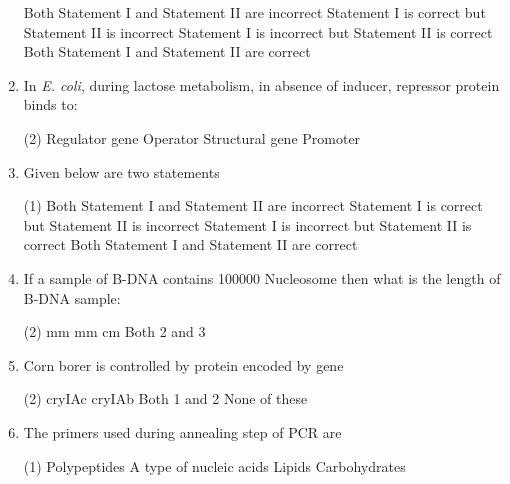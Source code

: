 \documentclass[twocolumn]{article}
\begin{document}
\begin{enumerate}
\begin{tasks}
              \task Both Statement I and Statement II are incorrect
              \task Statement I is correct but Statement II is incorrect
              \task Statement I is incorrect but Statement II is correct
              \task Both Statement I and Statement II are correct
          \end{tasks}
    \item In \textit{E. coli}, during lactose metabolism, in absence of inducer, repressor protein binds to:
          \begin{tasks}(2)
              \task Regulator gene
              \task Operator
              \task Structural gene
              \task Promoter
          \end{tasks}
    \item Given below are two statements
          \begin{tasks}(1)
              \task Both Statement I and Statement II are incorrect
              \task Statement I is correct but Statement II is incorrect
              \task Statement I is incorrect but Statement II is correct
              \task Both Statement I and Statement II are correct
          \end{tasks}
    \item If a sample of B-DNA contains 100000 Nucleosome then what is the length of B-DNA sample:
          \begin{tasks}(2)
               mm
               mm
               cm
              \task Both 2 and 3
          \end{tasks}
    \item Corn borer is controlled by protein encoded by gene
          \begin{tasks}(2)
              \task cryIAc
              \task cryIAb
              \task Both 1 and 2
              \task None of these
          \end{tasks}
    \item The primers used during annealing step of PCR are
          \begin{tasks}(1)
              \task Polypeptides
              \task A type of nucleic acids
              \task Lipids
              \task Carbohydrates
          \end{tasks}


\end{enumerate}
\end{document}
